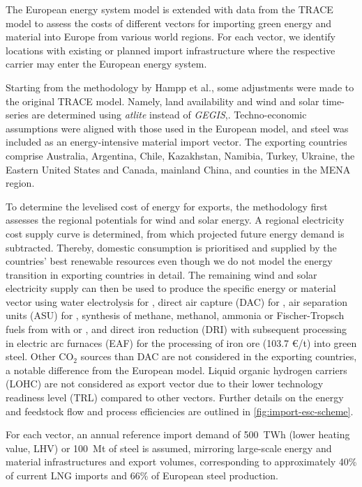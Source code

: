 The European energy system model is extended with data from the TRACE model
\cite{hamppImportOptions2023} to assess the costs of different vectors for
importing green energy and material into Europe from various world regions. For
each vector, we identify locations with existing or planned import
infrastructure where the respective carrier may enter the European energy
system.

Starting from the methodology by Hampp et al.\cite{hamppImportOptions2023}, some
adjustments were made to the original TRACE model. Namely, land availability and
wind and solar time-series are determined using
\textit{atlite}\cite{hofmannAtliteLightweight2021} instead of
\textit{GEGIS},\cite{mattssonAutopilotEnergy2021}. Techno-economic assumptions
were aligned with those used in the European model, and steel was included as an
energy-intensive material import vector. The exporting countries comprise
Australia, Argentina, Chile, Kazakhstan, Namibia, Turkey, Ukraine, the Eastern
United States and Canada, mainland China, and counties in the MENA region.

To determine the levelised cost of energy for exports, the methodology first
assesses the regional potentials for wind and solar energy. A regional
electricity cost supply curve is determined, from which projected future energy
demand is subtracted. Thereby, domestic consumption is prioritised and supplied
by the countries' best renewable resources even though we do not model the
energy transition in exporting countries in detail. The remaining wind and solar
electricity supply can then be used to produce the specific energy or material
vector using water electrolysis for , direct air capture (DAC) for
, air separation units (ASU) for , synthesis of methane,
methanol, ammonia or Fischer-Tropsch fuels from  with  or
, and  direct iron reduction (DRI) with subsequent processing in
electric arc furnaces (EAF) for the processing of iron ore (103.7 \euro{}/t)
into green steel. Other CO$_2$ sources than DAC are not considered in the
exporting countries, a notable difference from the European model. Liquid
organic hydrogen carriers (LOHC) are not considered as export vector due to
their lower technology readiness level (TRL) compared to other
vectors.\cite{irenaGlobalHydrogen2022} Further details on the energy and
feedstock flow and process efficiencies are outlined in
\cref{fig:import-esc-scheme}.

For each vector, an annual reference import demand of 500~TWh (lower heating
value, LHV) or 100~Mt of steel is assumed, mirroring large-scale energy and
material infrastructures and export volumes, corresponding to approximately 40\%
of current LNG
imports\cite{instituteforenergyeconomicsandfinancialanalysisEuropeanLNG2023} and
66\% of European steel
production.\cite{eurofer-theeuropeansteelassociationEuropeanSteel2023}

